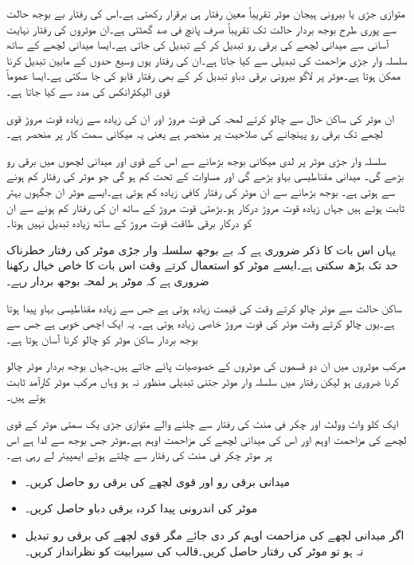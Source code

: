 متوازی جڑی یا بیرونی ہیجان موٹر تقریباً معین رفتار ہی برقرار رکھتی ہے۔اس کی رفتار بے بوجھ حالت سے پوری طرح بوجھ بردار حالت تک تقریباً صرف پانچ فی صد گھٹتی ہے۔ان موٹروں کی رفتار نہایت آسانی سے میدانی لچھے کی برقی رو تبدیل کر کے تبدیل کی جاتی ہے۔ایسا میدانی لچھے کے ساتھ سلسلہ وار جڑی مزاحمت کی تبدیلی سے کیا جاتا ہے۔ان کی رفتار یوں وسیع حدوں کے مابین تبدیل کرنا ممکن ہوتا ہے۔موٹر پر لاگو بیرونی برقی دباو تبدیل کر کے بھی رفتار قابو کی جا سکتی ہے۔ایسا عموماً قوی الیکٹرانکس کی مدد سے کیا جاتا ہے۔

ان موٹر کی ساکن حال سے چالو کرتے لمحہ کی قوت مروڑ اور ان کی زیادہ سے زیادہ قوت مروڑ قوی لچھے تک برقی رو پہنچانے کی صلاحیت پر منحصر ہے یعنی یہ میکانی سمت کار پر منحصر ہے۔

سلسلہ وار جڑی موٹر پر لدی میکانی بوجھ بڑھانے سے اس کے قوی اور میدانی لچھوں میں برقی رو بڑھے گی۔ میدانی مقناطیسی بہاو بڑھے گی اور مساوات   کے تحت  کم ہو گی جو موٹر کی رفتار کم ہونے سے ہوتی ہے۔ بوجھ بڑھانے سے ان موٹر کی رفتار کافی زیادہ کم ہوتی ہے۔ایسے موٹر ان جگہوں بہتر ثابت ہوتے ہیں جہاں زیادہ قوت مروڑ درکار ہو۔بڑھتی قوت مروڑ کے ساتھ ان کی رفتار کم ہونے سے ان کو درکار برقی طاقت قوت مروڑ کے ساتھ زیادہ تبدیل نہیں ہوتا۔

یہاں اس بات کا ذکر ضروری ہے کہ بے بوجھ سلسلہ وار جڑی موٹر کی رفتار خطرناک حد تک بڑھ سکتی ہے۔ایسے موٹر کو استعمال کرتے وقت اس بات کا خاص خیال رکھنا ضروری ہے کہ موٹر ہر لمحہ بوجھ بردار رہے۔

ساکن حالت سے موٹر چالو کرتے وقت    کی قیمت زیادہ ہوتی ہے جس سے زیادہ  مقناطیسی بہاو پیدا ہوتا ہے۔یوں چالو کرتے وقت موٹر کی قوت مروڑ خاصی زیادہ ہوتی ہے۔ یہ ایک اچھی خوبی ہے جس سے بوجھ بردار ساکن موٹر کو چالو کرنا آسان ہوتا ہے۔

مرکب موٹروں میں ان دو قسموں کی موٹروں کے خصوصیات پائے جاتے ہیں۔جہاں بوجھ بردار موٹر چالو کرنا ضروری ہو لیکن رفتار میں سلسلہ وار موٹر جتنی تبدیلی منظور نہ ہو وہاں مرکب موٹر کارآمد ثابت ہوتے ہیں۔

ایک   کلو واٹ  وولٹ اور  چکر فی منٹ کی رفتار سے چلنے والے متوازی جڑی یک سمتی موٹر کے قوی لچھے کی مزاحمت  اوہم اور اس کی میدانی لچھے کی مزاحمت   اوہم ہے۔موٹر جس بوجھ سے لدا ہے اس پر موٹر   چکر فی منٹ کی رفتار سے چلتے ہوئے   ایمپیئر لے رہی ہے۔ 
\begin{itemize}
\item
میدانی برقی رو اور قوی لچھے کی برقی رو حاصل کریں۔
\item
موٹر کی اندرونی پیدا کردہ برقی دباو حاصل کریں۔
\item
اگر میدانی لچھے کی مزاحمت  اوہم کر دی جائے  مگر قوی لچھے کی برقی رو تبدیل نہ ہو  تو موٹر کی رفتار حاصل کریں۔قالب کی سیرابیت کو نظرانداز کریں۔
\end{itemize}

